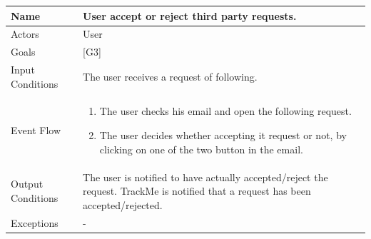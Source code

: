 \documentclass{article}
\begin{document}
\begin{center}
    \begin{tabular}{ | l | p{10cm} |}
    \hline
    Name & User accept or reject third party requests.\\ \hline
    Actors & User\\ \hline
   	Goals & {[G3]}\\ \hline
    Input Conditions & The user receives a request of following.\\ \hline
    Event Flow & \begin{enumerate}
    	\item The user checks his email and open the following request.
		\item The user decides whether accepting it request or not, by clicking on one of the two button in the email.
    \end{enumerate} \\ \hline
    Output Conditions & The user is notified to have actually accepted/reject the request. TrackMe is notified that a request has been accepted/rejected. \\ \hline
    Exceptions & - \\ \hline
    \end{tabular}
\end{center}
\end{document}
